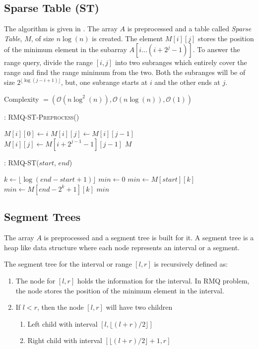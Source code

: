 \documentclass{article}
\begin{document}
\subsection{Sparse Table (ST)}
The algorithm is given in \cite{benderetal}. The array $A$ is preprocessed and a table called \textit{Sparse Table}, $M$, of size $n \log(n)$ is created. The element $M[i][j]$ stores the position of the minimum element in the subarray $A[i \ldots (i+2^j-1)]$. To answer the range query, divide the range $[i, j]$ into two subranges which entirely cover the range and find the range minimum from the two. Both the subranges will be of size $2^{\lfloor \log(j-i+1) \rfloor}$, but, one subrange starts at $i$ and the other ends at $j$. 

Complexity $= (\mathcal{O}(n \log^2(n)), \mathcal{O}(n \log(n)), \mathcal{O}(1))$

\begin{algorithm}
\begin{algorithmic}[1]
\caption{: \textsc{RMQ-ST-Preprocess}()}
\medskip
{}
	\STATE $M[i][0] \gets i$
\ENDFOR
\medskip
{}
			\STATE $M[i][j] \gets M[i][j-1]$
		\ELSE
			\STATE $M[i][j] \gets M[i+2^{j-1}-1][j-1]$
		\ENDIF
	\ENDFOR
\ENDFOR
\medskip
\RETURN $M$
\medskip
\end{algorithmic}
\end{algorithm}

\begin{algorithm}
\begin{algorithmic}[1]
\caption{: \textsc{RMQ-ST}($start$, $end$)}
\label{sparsetable}
\medskip
\STATE $k \gets \lfloor \log (end-start+1) \rfloor$
\STATE $min \gets 0$
\medskip
{}
	\STATE $min \gets M[start][k]$
\ELSE
	\STATE $min \gets M[end-2^k+1][k]$
\ENDIF
\medskip
\RETURN $min$
\medskip
\end{algorithmic}
\end{algorithm}

\subsection{Segment Trees}
The array $A$ is preprocessed and a segment tree is built for it. A segment tree is a heap like data structure where each node represents an interval or a segment.

The segment tree for the interval or range $[l, r]$ is recursively defined as:
\begin{enumerate}
\item The node for $[l, r]$ holds the information for the interval. In RMQ problem, the node stores the position of the minimum element in the interval.
\item If $l < r$, then the node $[l, r]$ will have two children
\begin{enumerate}
\item Left child with interval $[l, \lfloor (l+r)/2 \rfloor]$
\item Right child with interval $[\lfloor (l+r)/2 \rfloor + 1, r]$
\end{enumerate}
\end{enumerate}
\end{document}

